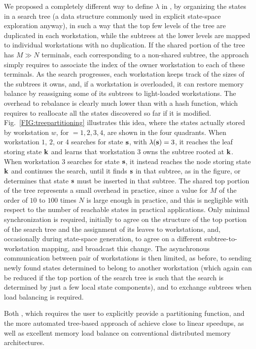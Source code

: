 \documentclass[copyright,creativecommons]{eptcs}
\begin{document}
We proposed a completely different way to define $\lambda$ in
\cite{1997JPDC-AutomaticDistrGen}, by organizing the states
in a search tree (a data structure commonly used in
explicit state-space exploration anyway), in such a way that the top
few levels of the tree are duplicated in each workstation, while the
subtrees at the lower levels are mapped to individual workstations
with no duplication. If the shared portion of the tree has $M \gg N$
terminals, each corresponding to a non-shared subtree, the approach
simply requires to associate the index of the owner workstation to
each of these terminals. As the search progresses, each workstation
keeps track of the sizes of the subtrees it owns,
and, if a workstation is overloaded, it can
restore memory balance by reassigning some of its subtrees to
light-loaded workstations.
The overhead to rebalance is clearly much
lower than with a hash function, which requires
to reallocate all the states discovered so far if it is modified.
Fig.~\ref{FIG:treepartitioning} illustrates this
idea, where the states actually stored by workstation $w$, for $ =
1,2,3,4$, are shown in the four quadrants.
When workstation $1$, $2$, or $4$ searches for state $\mathbf{s}$,
with $\lambda(\mathbf{s}) = 3$, it reaches the leaf storing state $\mathbf{k}$ and learns
that workstation $3$ owns the subtree rooted at $\mathbf{k}$.
When workstation $3$ searches for state $\mathbf{s}$, it instead reaches the
node storing state $\mathbf{k}$ and continues the search, until it finds $\mathbf{s}$ in that
subtree, as in the figure, or determines that state $\mathbf{s}$ must be
inserted in that subtree.
The shared top portion of the tree represents a small overhead in
practice, since a value for $M$ of the order of $10$ to $100$ times
$N$ is large enough in practice, and this is negligible with respect
to the number of reachable states in practical applications.
Only minimal synchronization is required, initially to agree on the
structure of the top portion of the search tree and the assignment
of its leaves to workstations, and, occasionally during state-space
generation, to agree on a different subtree-to-workstation mapping,
and broadcast this change.
The asynchronous communication between pair of workstations is then limited, as
before, to sending newly found states determined to belong to
another workstation (which again can be reduced if the top portion
of the search tree is such that the search is determined by just a
few local state components), and to exchange subtrees when load
balancing is required.

Both \cite{1998INFORMSJC-DistrGen}, which requires the user to explicitly
provide a partitioning function, and the more automated
tree-based approach of \cite{1997JPDC-AutomaticDistrGen}
achieve close to linear speedups, as well as excellent memory load balance
on conventional distributed memory architectures.
\end{document}
